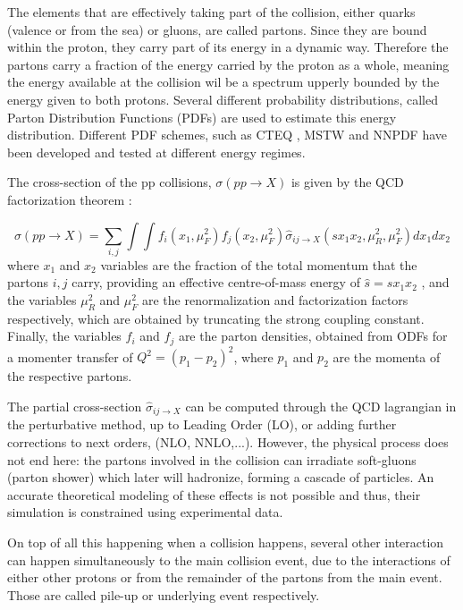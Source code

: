 The elements that are effectively taking part of the collision, either quarks (valence or from the sea) or gluons,  are called partons. Since they are bound within the proton, they carry part of its energy in a dynamic way. Therefore the partons carry a fraction of the energy carried by the proton as a whole, meaning the energy available at the collision wil be a spectrum upperly bounded by the energy given to both protons. Several different probability distributions, called Parton Distribution Functions (PDFs) are used to estimate this energy distribution. Different PDF schemes, such as CTEQ \cite{Pumplin:2002vw}, MSTW \cite{Martin:2009iq} and NNPDF \cite{Ball:2008by} have been developed and tested at different energy regimes.

The cross-section of the pp collisions, $\sigma(pp\rightarrow X)$ is given by the QCD factorization theorem \cite{Butterworth:2012fj}:

\begin{equation}
    \sigma(pp\rightarrow X) = \sum_{i,j} \int \int f_i (x_1 , \mu_F^2 )f_j (x_2 , \mu_F^2 ) \hat{\sigma}_{ij \rightarrow X} (s x_1 x_2 , \mu_R^2 , \mu_F^2 ) dx_1 dx_2 
\end{equation}
where $x_1$ and $x_2$ variables are the fraction of the total momentum that the partons $i,j$ carry, providing an effective centre-of-mass energy of $\hat{s} = sx_1 x_2$ , and the variables $\mu_R^2$ and $\mu_F^2$ are the renormalization and factorization factors respectively, which are obtained by truncating the strong coupling constant. Finally, the variables $f_i$ and $f_j$ are the parton densities, obtained from ODFs for a momenter transfer of $Q^2 = (p_1 - p_2 )^2$, where $p_1$ and $p_2$ are the momenta of the respective partons.

The partial cross-section $\hat{\sigma}_{ij \rightarrow X}$ can be computed through the QCD lagrangian in the perturbative method, up to Leading Order (LO), or adding further corrections to next orders, (NLO, NNLO,...). However, the physical process does not end here: the partons involved in the collision can irradiate soft-gluons (parton shower) which later will hadronize, forming a cascade of particles. An accurate theoretical modeling of these effects is not possible and thus, their simulation is constrained using experimental data.

On top of all this happening when a collision happens, several other interaction can happen simultaneously to the main collision event, due to the interactions of either other protons or from the remainder of the partons from the main event. Those are called pile-up or underlying event respectively.


